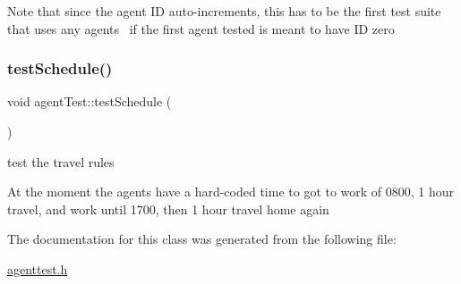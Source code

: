 Note that since the agent ID auto-\/increments, this has to be the first test suite that uses any agents~\newline
if the first agent tested is meant to have ID zero \mbox{\label{classagentTest_adaa25e2c092be46311aea330d19d7f94}} 
\subsubsection{\texorpdfstring{test\+Schedule()}{testSchedule()}}
{\footnotesize\ttfamily void agent\+Test\+::test\+Schedule (\begin{DoxyParamCaption}{ }\end{DoxyParamCaption})\hspace{0.3cm}{\ttfamily [inline]}}



test the travel rules 

At the moment the agents have a hard-\/coded time to got to work of 0800, 1 hour travel, and work until 1700, then 1 hour travel home again 

The documentation for this class was generated from the following file\+:\begin{DoxyCompactItemize}
\item 
\mbox{\hyperlink{agenttest_8h}{agenttest.\+h}}\end{DoxyCompactItemize}
